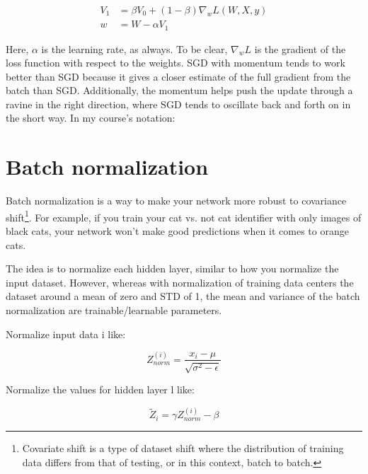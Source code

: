 \begin{align}
    V_1 &= \beta V_0  + \left( 1 - \beta \right) \nabla_w L \left( W, X, y \right)\\
    w &= W - \alpha V_1
\end{align}


Here, $ \alpha $  is the learning rate, as always. To be clear, $\nabla_w L$ is the gradient of the loss function with respect to the weights. SGD with momentum tends to work better than SGD because it gives a closer estimate of the full gradient from the batch than SGD. Additionally, the momentum helps push the update through a ravine in the right direction, where SGD tends to oscillate back and forth on in the short way. In my course's notation:


\section{Batch normalization}

Batch normalization is a way to make your network more robust to covariance shift\footnote{Covariate shift is a type of dataset shift where the distribution of training data differs from that of testing, or in this context, batch to batch.}. For example, if you train your cat vs. not cat identifier with only images of black cats, your network won't make good predictions when it comes to orange cats.

The idea is to normalize each hidden layer, similar to how you normalize the input dataset. However, whereas with normalization of training data centers the dataset around a mean of zero and STD of 1, the mean and variance of the batch normalization are trainable/learnable parameters.

Normalize input data i like:


\begin{equation}
    Z_{norm}^{(i)} = \frac{x_i-\mu}{\sqrt{\sigma^2-\epsilon}}
\end{equation}


Normalize the values for hidden layer l like:

\begin{equation}
\widetilde{Z}_i = \gamma Z_{norm}^{(i)} - \beta
\end{equation}

